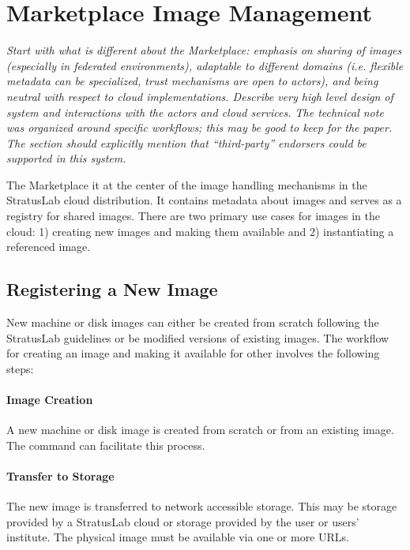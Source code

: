 \section{Marketplace Image Management}
\label{sec:approach}

{\em Start with what is different about the Marketplace: emphasis on
  sharing of images (especially in federated environments), adaptable
  to different domains (i.e. flexible metadata can be specialized,
  trust mechanisms are open to actors), and being neutral with respect
  to cloud implementations.  Describe very high level design of system
  and interactions with the actors and cloud services.  The technical
  note was organized around specific workflows; this may be good to
  keep for the paper.  The section should explicitly mention that
  ``third-party'' endorsers could be supported in this system.}

The Marketplace it at the center of the image handling mechanisms in
the StratusLab cloud distribution.  It contains metadata about images
and serves as a registry for shared images.  There are two primary use
cases for images in the cloud: 1) creating new images and making them
available and 2) instantiating a referenced image.

\subsection{Registering a New Image}

New machine or disk images can either be created from scratch
following the StratusLab guidelines or be modified versions of
existing images.  The workflow for creating an image and making it
available for other involves the following steps:

\paragraph{Image Creation} A new machine or disk image is created from
  scratch or from an existing image.  The 
  command can facilitate this process.

\paragraph{Transfer to Storage} The new image is transferred to network
  accessible storage.  This may be storage provided by a StratusLab
  cloud or storage provided by the user or users' institute.  The
  physical image must be available via one or more URLs\@.

